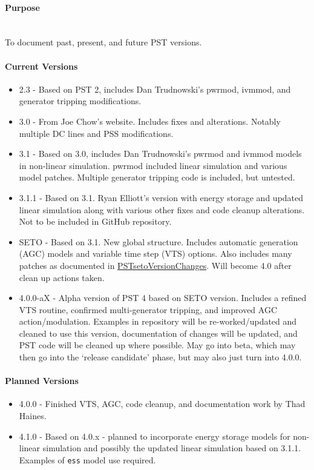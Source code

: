 \documentclass[12pt]{article}
\begin{document}
\onehalfspacing
\raggedright
\paragraph{Purpose} \ \\
To document past, present, and future PST versions.

\paragraph{Current Versions}
\begin{itemize}
\item 2.3 - Based on PST 2, includes Dan Trudnowski's pwrmod, ivmmod, and generator tripping modifications.
\item 3.0 - From Joe Chow's website. 
Includes fixes and alterations. 
Notably multiple DC lines and PSS modifications.
\item 3.1 - Based on 3.0, includes Dan Trudnowski's pwrmod and ivmmod models in non-linear simulation. 
pwrmod included linear simulation and various model patches. 
Multiple generator tripping code is included, but untested.
\item 3.1.1 - Based on 3.1. Ryan Elliott's version with energy storage and updated linear simulation along with various other fixes and code cleanup alterations. 
Not to be included in GitHub repository.
\item SETO - Based on 3.1. New global structure. 
Includes automatic generation (AGC) models and variable time step (VTS) options. 
Also includes many patches as documented in 
\href{https://github.com/thadhaines/MT-Tech-SETO/tree/master/researchDocs/TEX/one-offs/200709-PSTsetoVersionChanges}{PSTsetoVersionChanges}. 
% 
Will become 4.0 after clean up actions taken.
\item 4.0.0-aX - Alpha version of PST 4 based on SETO version. 
Includes a refined VTS routine, confirmed multi-generator tripping, and improved AGC action/modulation.
Examples in repository will be re-worked/updated and cleaned to use this version, 
documentation of changes will be updated, 
and PST code will be cleaned up where possible.
May go into beta, which may then go into the `release candidate' phase, but may also just turn into 4.0.0.

\end{itemize}

\paragraph{Planned Versions}
\begin{itemize}
\item 4.0.0 - Finished VTS, AGC, code cleanup, and documentation work by Thad Haines.
\item 4.1.0 - Based on 4.0.x - planned to incorporate energy storage models for non-linear simulation and possibly the updated linear simulation based on 3.1.1. Examples of \verb|ess| model use required.
\end{itemize}
\end{document}
